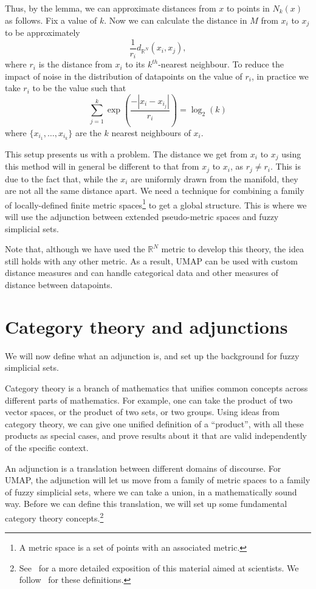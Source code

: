\documentclass[a4paper,12pt,leqno]{article} \usepackage{amsmath}
\newcommand{\RR}{\mathbb{R}} \newcommand{\QQ}{\mathbb{Q}}
\theoremstyle{definition}
\begin{document}
Thus, by the lemma, we can approximate distances from $x$ to points in $N_k(x)$
as follows.
Fix a value of $k$.
Now we can calculate the distance in $M$ from $x_i$ to $x_j$ to be
approximately
$$\frac{1}{r_i}d_{\RR^N}(x_i, x_j),$$
where $r_i$ is the distance from $x_i$ to its $k^{th}$-nearest neighbour.
To reduce the impact of noise in the distribution of datapoints on the value of
$r_i$, in practice we take $r_i$ to be the value such that
$$\sum_{j=1}^k\exp\left(\frac{-|x_i-x_{i_j}|}{r_i}\right) = \log_2(k)$$
where $\{x_{i_1},\ldots,x_{i_k}\}$ are the $k$ nearest neighbours of $x_i$.

This setup presents us with a problem.
The distance we get from $x_i$ to $x_j$ using this method will in general be
different to that from $x_j$ to $x_i$, as $r_j\not= r_i$.
This is due to the fact that, while the $x_i$ are uniformly drawn from the
manifold, they are not all the same distance apart.
We need a technique for combining a family of locally-defined finite metric
spaces\footnote{
  A metric space is a set of points with an associated metric.
}
to get a global structure.
This is where we will use the adjunction between extended pseudo-metric spaces
and fuzzy simplicial sets.

Note that, although we have used the $\RR^N$ metric to develop this theory, the
idea still holds with any other metric.
As a result, UMAP can be used with custom distance measures and can handle
categorical data and other measures of distance between datapoints.

\section{Category theory and adjunctions}

We will now define what an adjunction is, and set up the background for fuzzy
simplicial sets.

Category theory is a branch of mathematics that unifies common concepts across
different parts of mathematics.
For example, one can take the product of two vector spaces, or the product of
two sets, or two groups.
Using ideas from category theory, we can give one unified definition of a
``product'', with all these products as special cases, and prove results about
it that are valid independently of the specific context.

An adjunction is a translation between different domains of discourse.
For UMAP, the adjunction will let us move from a family of metric spaces to
a family of fuzzy simplicial sets, where we can take a union, in
a mathematically sound way.
Before we can define this translation, we will set up some fundamental category
theory concepts.\footnote{
  See~\cite{Spivak18} for a more detailed exposition of this material aimed at
  scientists.  We follow~\cite{Riehl} for these definitions.
}
\end{document}

